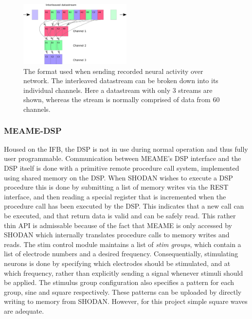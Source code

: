 \begin{figure}[h!]
  \centering
  \includegraphics[width=0.5\textwidth]{fig/reorder.png}
  \caption[Data format of neural recordings]{
    The format used when sending recorded neural activity over network.
    The interleaved datastream can be broken down into its individual channels.
    Here a datastream with only 3 streams are shown, whereas the stream is
    normally comprised of data from 60 channels.
  }
  \label{figLayout}
\end{figure}
\subsubsection{MEAME-DSP}
Housed on the IFB, the DSP is not in use during normal operation and thus fully
user programmable.
Communication between MEAME's DSP interface and the DSP itself is done with a
primitive remote procedure call system, implemented using shared memory on the
DSP.
When SHODAN wishes to execute a DSP procedure this is done by submitting a list
of memory writes via the REST interface, and then reading a special register
that is incremented when the procedure call has been executed by the DSP.
This indicates that a new call can be executed, and that return data is valid and
can be safely read.
This rather thin API is admissable because of the fact that MEAME is only
accessed by SHODAN which internally translates procedure calls to memory writes
and reads.
The stim control module maintains a list of \emph{stim groups}, which contain a
list of electrode numbers and a desired frequency.
Consequentially, stimulating neurons is done by specifying which electrodes
should be stimulated, and at which frequency, rather than explicitly sending a
signal whenever stimuli should be applied.
The stimulus group configuration also specifies a pattern for each group, sine
and square respectively.
These patterns can be uploaded by directly writing to memory from SHODAN.
However, for this project simple square waves are adequate.
